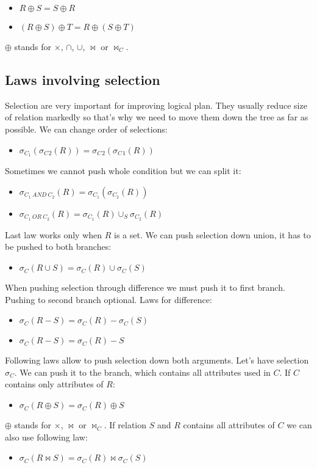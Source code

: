 \begin{itemize}
\item $R \oplus S = S \oplus R$

\item $(R \oplus S) \oplus T = R \oplus (S \oplus T)$
\end{itemize}
$\oplus$ stands for $\times$, $\cap$, $\cup$, $\Join$ or $\Join_C$.

\subsection{Laws involving selection}

Selection are very important for improving logical plan. They usually reduce size of relation markedly so that's why we need to move them down the tree as far as possible.
We can change order of selections:

\begin{itemize}
\item $\sigma_{C_1}(\sigma_C{_2}(R)) = \sigma_C{_2}(\sigma_C{_1}(R))$
\end{itemize}
Sometimes we cannot push whole condition but we can split it:

\begin{itemize}
\item $\sigma_{C_1~AND~C_2}(R)=\sigma_{C_1}(\sigma_{C_2}(R))$

\item $\sigma_{C_1~OR~C_2}(R)=\sigma_{C_1}(R) \cup_S \sigma_{C_2}(R)$
\end{itemize}
Last law works only when $R$ is a set. We can push selection down union, it has to be pushed to both branches:
\begin{itemize}
\item $\sigma_{C}(R \cup S)=\sigma_{C}(R) \cup \sigma_{C}(S)$
\end{itemize}

When pushing selection through difference we must push it to first branch. Pushing to second branch optional. Laws for difference: 
\begin{itemize}
\item $\sigma_{C}(R-S)=\sigma_{C}(R) - \sigma_{C}(S)$
\item $\sigma_{C}(R-S)=\sigma_{C}(R) - S$
\end{itemize}

Following laws allow to push selection down both arguments. Let's have selection $\sigma_C$. We can push it to the branch, which contains all attributes used in $C$. If $C$ contains only attributes of $R$:
\begin{itemize}
\item $\sigma_{C}(R \oplus S)=\sigma_{C}(R) \oplus S$
\end{itemize}
$\oplus$ stands for $\times$, $\Join$ or $\Join_C$. If relation $S$ and $R$ contains all attributes of $C$ we can also use following law:
\begin{itemize}
\item $\sigma_{C}(R \Join S)=\sigma_{C}(R) \Join  \sigma_{C}(S)$
\end{itemize}


